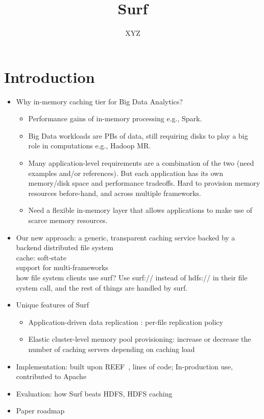 \documentclass[twocolumn,10pt]{article}
\title{Surf}
\author{XYZ}
\begin{document}
\maketitle

\begin{abstract}


\end{abstract}

\section{Introduction}

\begin{itemize}
\item Why in-memory caching tier for Big Data Analytics?

\begin{itemize}
\item Performance gains of in-memory processing e.g., Spark.
\item Big Data workloads are PBs of data, still requiring disks to play a big role in computations e.g., Hadoop MR.
\item Many application-level requirements are a combination of the two (need examples and/or references).
But each application has its own memory/disk space and performance tradeoffs.
Hard to provision memory resources before-hand, and across multiple frameworks.
\item Need a flexible in-memory layer that allows applications to make use of scarce memory resources.
\end{itemize}

\item Our new approach: a generic, transparent caching service backed by a backend distributed file system \\

cache: soft-state\\

support for multi-frameworks\\

how file system clients use surf? Use surf:// instead of hdfs:// in their file system call, and the rest of things are handled by surf.

\item Unique features of Surf
\begin{itemize}
\item Application-driven data replication : per-file replication policy
\item Elastic cluster-level memory pool provisioning: increase or decrease the number of caching servers depending on caching load
\end{itemize}

\item Implementation: built upon REEF~\cite{reef}, lines of code; 
In-production use, contributed to Apache

\item Evaluation: how Surf beats HDFS, HDFS caching

\item Paper roadmap

\end{itemize}
\end{document}
